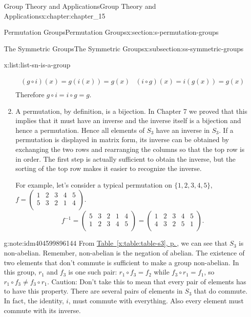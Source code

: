 \documentclass[twoside,10pt,]{book}
\newcommand{\xreffont}{\relax}
\numberwithin{equation}{section}
\begin{document}
\begin{chapterptx}{Group Theory and Applications}{}{Group Theory and Applications}{}{}{x:chapter:chapter_15}
\begin{sectionptx}{Permutation Groups}{}{Permutation Groups}{}{}{x:section:s-permutation-groups}
\begin{subsectionptx}{The Symmetric Groups}{}{The Symmetric Groups}{}{}{x:subsection:ss-symmetric-groups}
\begin{listptx}{\textbf{}}{x:list:list-sn-is-a-group}{}
\begin{enumerate}[label=(\arabic*)]
\begin{equation*}
\begin{array}{lr}
(g\circ i)(x) = g(i(x)) = g(x) &(i\circ g)(x) = i(g(x)) = g(x)\\
\end{array}
\end{equation*}
Therefore   \(g\circ i = i\circ g=g\).%
\item{}A permutation, by definition, is a bijection.  In Chapter 7 we proved that this implies that it must have an inverse and the inverse itself is a bijection and hence a permutation.    Hence all elements of \(S_3\) have an inverse in \(S_3\). If a permutation is displayed in matrix form, its inverse can be obtained by exchanging the two rows and rearranging the columns so that the top row is in order. The first step is actually sufficient to obtain the inverse, but the sorting of the top row makes it easier to recognize the inverse.%
\par
For example, let's consider a typical permutation on \(\{1,2,3,4,5\}\), \(f= \left(
\begin{array}{ccccc}
1 & 2 & 3 & 4 & 5 \\
5 & 3 & 2 & 1 & 4 \\
\end{array}
\right)\).%
\begin{equation*}
f^{-1}= \left(
\begin{array}{ccccc}
5 & 3 & 2 & 1 & 4 \\
1 & 2 & 3 & 4 & 5 \\
\end{array} 
\right)= \left(
\begin{array}{ccccc}
1 & 2 & 3 & 4 & 5 \\
4 & 3 & 2 & 5 & 1 \\
\end{array}
\right)\text{.}
\end{equation*}
%
\end{enumerate}
\end{listptx}%
\begin{note}{}{g:note:idm404599896144}%
From \hyperref[x:table:table-s3]{Table~{\xreffont\ref{x:table:table-s3}}, p.\,\pageref{x:table:table-s3}}, we can see that \(S_3\) is non-abelian. Remember, non-abelian is the negation of abelian. The existence of two elements that don't commute is sufficient to make a group non-abelian. In this group, \(r_1\) and \(f_3\) is one such pair: \(r_1\circ f_3= f_2\)  while   \(f_3\circ
r_1= f_1\), so \(r_1\circ f_3\neq f_3\circ r_1\).   Caution:  Don't take this to mean that every pair of elements has to have this property.  There are several pairs of elements in \(S_3\) that do  commute.  In fact, the identity, \(i\), must commute with everything.  Also every element must commute with its inverse.%

\end{note}
\end{subsectionptx}
\end{sectionptx}
\end{chapterptx}
\end{document}
